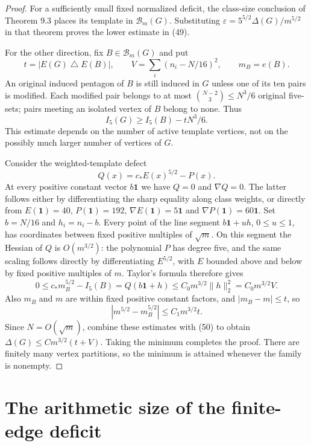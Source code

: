 \documentclass[11pt]{amsart}
\theoremstyle{definition}
\theoremstyle{remark}
\begin{document}
\begin{proof}
For a sufficiently small fixed normalized deficit, the class-size conclusion
of Theorem 9.3 places its template in $\mathcal B_m(G)$. Substituting
$\varepsilon=5^{5/2}\Delta(G)/m^{5/2}$ in that theorem proves the lower
estimate in (49).

For the other direction, fix $B\in\mathcal B_m(G)$ and put
\[
 t=|E(G)\mathbin{\triangle}E(B)|,\qquad
 V=\sum_i(n_i-N/16)^2,\qquad m_B=e(B).
\]
An original induced pentagon of $B$ is still induced in $G$ unless one of
its ten pairs is modified. Each modified pair belongs to at most
$\binom{N-2}3\leq N^3/6$ original five-sets; pairs meeting an isolated
vertex of $B$ belong to none. Thus
\begin{equation}\tag{50}\label{eq:50}
 I_5(G)\geq I_5(B)-tN^3/6.
\end{equation}
This estimate depends on the number of active template vertices, not on the
possibly much larger number of vertices of $G$.

Consider the weighted-template defect
\[
 Q(x)=c_\ast E(x)^{5/2}-P(x).
\]
At every positive constant vector $b\mathbf1$ we have $Q=0$ and
$\nabla Q=0$. The latter follows either by differentiating the sharp equality
along class weights, or directly from $E(\mathbf1)=40$, $P(\mathbf1)=192$,
$\nabla E(\mathbf1)=5\mathbf1$ and $\nabla P(\mathbf1)=60\mathbf1$.
Set $b=N/16$ and $h_i=n_i-b$. Every point of the line segment
$b\mathbf1+uh$, $0\leq u\leq1$, has coordinates between fixed positive
multiples of $\sqrt m$. On this segment the Hessian of $Q$ is
$O(m^{3/2})$: the polynomial $P$ has degree five, and the same scaling
follows directly by differentiating $E^{5/2}$, with $E$ bounded above and
below by fixed positive multiples of $m$. Taylor's formula therefore gives
\[
 0\leq c_\ast m_B^{5/2}-I_5(B)=Q(b\mathbf1+h)
 \leq C_0m^{3/2}\|h\|_2^2=C_0m^{3/2}V.
\]
Also $m_B$ and $m$ are within fixed positive constant factors, and
$|m_B-m|\leq t$, so
\[
 |m^{5/2}-m_B^{5/2}|\leq C_1m^{3/2}t.
\]
Since $N=O(\sqrt m)$, combine these estimates with (50) to obtain
$\Delta(G)\leq Cm^{3/2}(t+V)$. Taking the minimum completes the proof.
There are finitely many vertex partitions, so the minimum is attained
whenever the family is nonempty.
\end{proof}

\section{The arithmetic size of the finite-edge deficit}
\label{sec:arithmetic-size}
\end{document}
